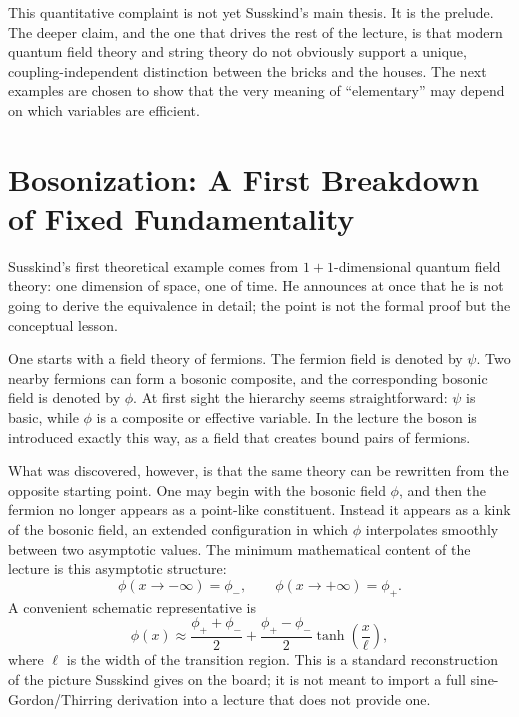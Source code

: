 This quantitative complaint is not yet Susskind's main thesis. It is the prelude. The deeper claim, and the one that drives the rest of the lecture, is that modern quantum field theory and string theory do not obviously support a unique, coupling-independent distinction between the bricks and the houses. The next examples are chosen to show that the very meaning of ``elementary'' may depend on which variables are efficient.

\section{Bosonization: A First Breakdown of Fixed Fundamentality}

Susskind's first theoretical example comes from \(1+1\)-dimensional quantum field theory: one dimension of space, one of time. He announces at once that he is not going to derive the equivalence in detail; the point is not the formal proof but the conceptual lesson.

One starts with a field theory of fermions. The fermion field is denoted by \(\psi\). Two nearby fermions can form a bosonic composite, and the corresponding bosonic field is denoted by \(\phi\). At first sight the hierarchy seems straightforward: \(\psi\) is basic, while \(\phi\) is a composite or effective variable. In the lecture the boson is introduced exactly this way, as a field that creates bound pairs of fermions.

What was discovered, however, is that the same theory can be rewritten from the opposite starting point. One may begin with the bosonic field \(\phi\), and then the fermion no longer appears as a point-like constituent. Instead it appears as a kink of the bosonic field, an extended configuration in which \(\phi\) interpolates smoothly between two asymptotic values. The minimum mathematical content of the lecture is this asymptotic structure:
\begin{equation}
\phi(x\to -\infty)=\phi_-,
\qquad
\phi(x\to +\infty)=\phi_+.
\end{equation}
A convenient schematic representative is
\begin{equation}
\phi(x)\approx \frac{\phi_++\phi_-}{2}
+
\frac{\phi_+-\phi_-}{2}\tanh\!\left(\frac{x}{\ell}\right),
\end{equation}
where \(\ell\) is the width of the transition region. This is a standard reconstruction of the picture Susskind gives on the board; it is not meant to import a full sine-Gordon/Thirring derivation into a lecture that does not provide one.

